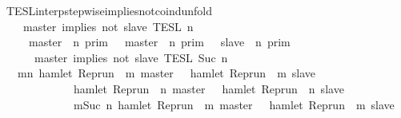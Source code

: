 \begin{isabellebody}
\ TESL{\isacharunderscore}interp{\isacharunderscore}stepwise{\isacharunderscore}implies{\isacharunderscore}not{\isacharunderscore}coind{\isacharunderscore}unfold{\isacharcolon}\isanewline
\ \ \ {\isacartoucheopen}{\isasymlbrakk}\ master\ implies\ not\ slave\ {\isasymrbrakk}\isactrlsub T\isactrlsub E\isactrlsub S\isactrlsub L\isactrlbsup {\isasymge}\ n\isactrlesup \ {\isacharequal}\isanewline
\ \ \ \ {\isacharparenleft}{\isasymlbrakk}\ master\ {\isasymnot}{\isasymUp}\ n\ {\isasymrbrakk}\isactrlsub p\isactrlsub r\isactrlsub i\isactrlsub m\ {\isasymunion}\ {\isasymlbrakk}\ master\ {\isasymUp}\ n\ {\isasymrbrakk}\isactrlsub p\isactrlsub r\isactrlsub i\isactrlsub m\ {\isasyminter}\ {\isasymlbrakk}\ slave\ {\isasymnot}{\isasymUp}\ n\ {\isasymrbrakk}\isactrlsub p\isactrlsub r\isactrlsub i\isactrlsub m{\isacharparenright}\isanewline
\ \ \ \ {\isasyminter}\ {\isasymlbrakk}\ master\ implies\ not\ slave\ {\isasymrbrakk}\isactrlsub T\isactrlsub E\isactrlsub S\isactrlsub L\isactrlbsup {\isasymge}\ Suc\ n\isactrlesup {\isacartoucheclose}\isanewline
%
\isadelimproof
\ \ %
\endisadelimproof
%
\isatagproof
{}\isamarkupfalse%
\ {\isacharminus}\isanewline
\ \ \ \ \isamarkupfalse%
\ {\isacartoucheopen}{\isacharbraceleft}\ {\isasymrho}{\isachardot}\ {\isasymforall}m{\isasymge}n{\isachardot}\ hamlet\ {\isacharparenleft}{\isacharparenleft}Rep{\isacharunderscore}run\ {\isasymrho}{\isacharparenright}\ m\ master{\isacharparenright}\ {\isasymlongrightarrow}\ {\isasymnot}\ hamlet\ {\isacharparenleft}{\isacharparenleft}Rep{\isacharunderscore}run\ {\isasymrho}{\isacharparenright}\ m\ slave{\isacharparenright}\ {\isacharbraceright}\isanewline
\ \ \ \ \ \ \ \ \ \ {\isacharequal}\ {\isacharbraceleft}\ {\isasymrho}{\isachardot}\ hamlet\ {\isacharparenleft}{\isacharparenleft}Rep{\isacharunderscore}run\ {\isasymrho}{\isacharparenright}\ n\ master{\isacharparenright}\ {\isasymlongrightarrow}\ {\isasymnot}\ hamlet\ {\isacharparenleft}{\isacharparenleft}Rep{\isacharunderscore}run\ {\isasymrho}{\isacharparenright}\ n\ slave{\isacharparenright}\ {\isacharbraceright}\isanewline
\ \ \ \ \ \ \ \ \ \ {\isasyminter}\ {\isacharbraceleft}\ {\isasymrho}{\isachardot}\ {\isasymforall}m{\isasymge}Suc\ n{\isachardot}\ hamlet\ {\isacharparenleft}{\isacharparenleft}Rep{\isacharunderscore}run\ {\isasymrho}{\isacharparenright}\ m\ master{\isacharparenright}\ {\isasymlongrightarrow}\ {\isasymnot}\ hamlet\ {\isacharparenleft}{\isacharparenleft}Rep{\isacharunderscore}run\ {\isasymrho}{\isacharparenright}\ m\ slave{\isacharparenright}\ {\isacharbraceright}{\isacartoucheclose}\isanewline

\end{isabellebody}
